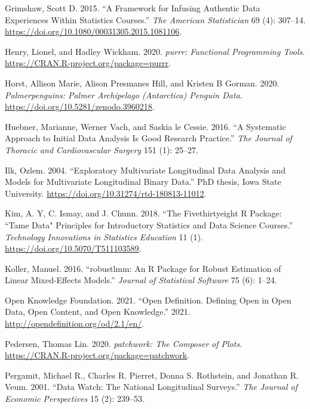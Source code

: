 \documentclass{article}
\newlength{\cslhangindent}
\newlength{\cslentryspacingunit} %
\newenvironment{CSLReferences}[2] %
 {%
  \setlength{\parindent}{0pt}
  \ifodd #1
  \let\oldpar\par
  \def\par{\hangindent=\cslhangindent\oldpar}
  \fi
  \setlength{\parskip}{#2\cslentryspacingunit}
 }%
 {}
\begin{document}
\begin{CSLReferences}{1}{0}
\leavevmode{}%
Grimshaw, Scott D. 2015. {``A Framework for Infusing Authentic Data Experiences Within Statistics Courses.''} \emph{The American Statistician} 69 (4): 307--14. \url{https://doi.org/10.1080/00031305.2015.1081106}.

\leavevmode{}%
Henry, Lionel, and Hadley Wickham. 2020. \emph{{purrr: Functional Programming Tools}}. \url{https://CRAN.R-project.org/package=purrr}.

\leavevmode{}%
Horst, Allison Marie, Alison Presmanes Hill, and Kristen B Gorman. 2020. \emph{Palmerpenguins: Palmer Archipelago (Antarctica) Penguin Data}. \url{https://doi.org/10.5281/zenodo.3960218}.

\leavevmode{}%
Huebner, Marianne, Werner Vach, and Saskia le Cessie. 2016. {``A Systematic Approach to Initial Data Analysis Is Good Research Practice.''} \emph{The Journal of Thoracic and Cardiovascular Surgery} 151 (1): 25--27.

\leavevmode{}%
Ilk, Ozlem. 2004. {``Exploratory Multivariate Longitudinal Data Analysis and Models for Multivariate Longitudinal Binary Data.''} PhD thesis, Iowa State University. \url{https://doi.org/10.31274/rtd-180813-11012}.

\leavevmode{}%
Kim, A. Y, C. Ismay, and J. Chunn. 2018. {``The Fivethirtyeight {R} Package: ``Tame Data" Principles for Introductory Statistics and Data Science Courses.''} \emph{Technology Innovations in Statistics Education} 11 (1). \url{https://doi.org/10.5070/T511103589}.

\leavevmode{}%
Koller, Manuel. 2016. {``{robustlmm: An R Package for Robust Estimation of Linear Mixed-Effects Models}.''} \emph{Journal of Statistical Software} 75 (6): 1--24.

\leavevmode{}%
Open Knowledge Foundation. 2021. {``Open Definition. Defining Open in Open Data, Open Content, and Open Knowledge.''} 2021. \url{http://opendefinition.org/od/2.1/en/}.

\leavevmode{}%
Pedersen, Thomas Lin. 2020. \emph{{patchwork: The Composer of Plots}}. \url{https://CRAN.R-project.org/package=patchwork}.

\leavevmode{}%
Pergamit, Michael R., Charles R. Pierret, Donna S. Rothstein, and Jonathan R. Veum. 2001. {``Data Watch: The National Longitudinal Surveys.''} \emph{The Journal of Economic Perspectives} 15 (2): 239--53.


\end{CSLReferences}
\end{document}
